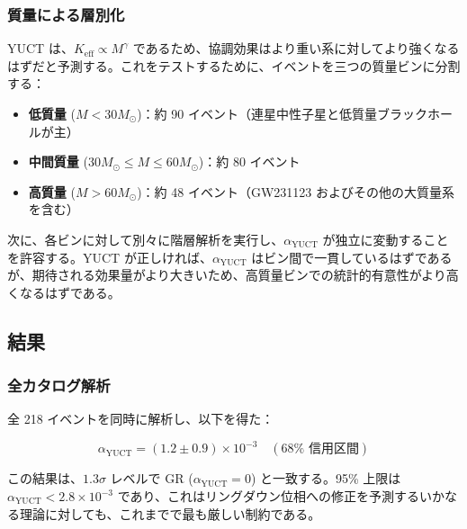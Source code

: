 \documentclass[11pt,a4paper]{article}
\theoremstyle{remark}
\newcommand{\Keff}{K_{\mathrm{eff}}}
\begin{document}
	\subsubsection{質量による層別化}
	
	YUCT は、$\Keff \propto M^{\gamma}$ であるため、協調効果はより重い系に対してより強くなるはずだと予測する。これをテストするために、イベントを三つの質量ビンに分割する：
	
	\begin{itemize}
		\item \textbf{低質量} ($M < 30 M_\odot$)：約 90 イベント（連星中性子星と低質量ブラックホールが主）
		\item \textbf{中間質量} ($30 M_\odot \le M \le 60 M_\odot$)：約 80 イベント
		\item \textbf{高質量} ($M > 60 M_\odot$)：約 48 イベント（GW231123 およびその他の大質量系を含む）
	\end{itemize}
	
	次に、各ビンに対して別々に階層解析を実行し、$\alpha_{\text{YUCT}}$ が独立に変動することを許容する。YUCT が正しければ、$\alpha_{\text{YUCT}}$ はビン間で一貫しているはずであるが、期待される効果量がより大きいため、高質量ビンでの統計的有意性がより高くなるはずである。
	
	\subsection{結果}
	
	\subsubsection{全カタログ解析}
	
	全 218 イベントを同時に解析し、以下を得た：
	
	\begin{equation}
		\alpha_{\text{YUCT}} = (1.2 \pm 0.9) \times 10^{-3} \quad (68\% \text{ 信用区間})
		\label{eq:alpha-result}
	\end{equation}
	
	この結果は、$1.3\sigma$ レベルで GR ($\alpha_{\text{YUCT}} = 0$) と一致する。95\% 上限は $\alpha_{\text{YUCT}} < 2.8 \times 10^{-3}$ であり、これはリングダウン位相への修正を予測するいかなる理論に対しても、これまでで最も厳しい制約である。
	
\end{document}
